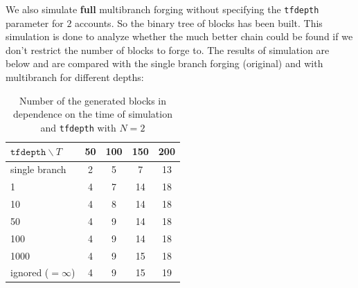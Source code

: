 \documentclass[12pt]{article}
\begin{document}
We also simulate {\bf full} multibranch forging without specifying the \texttt{tfdepth} parameter for $2$ accounts. So the binary tree of blocks has been
built. This simulation is done to analyze whether the much better chain could be found if we don't restrict the number of blocks to forge to. The results
of simulation are below and are compared with the single branch forging (original) and with multibranch for different depths:

\begin{table}[H]
\caption{Number of the generated blocks in dependence on the time of simulation and \texttt{tfdepth} with $N=2$}
\begin{center}
\begin{tabular}{|l|c|c|c|c|}
\hline
$\texttt{tfdepth}\backslash T$ & 50 & 100 & 150 & 200\\
\hline
single branch & 2 & 5 & 7 & 13\\
1 & 4 & 7 & 14 & 18\\
10 & 4 & 8 & 14 & 18 \\
50 & 4 & 9 & 14 & 18 \\
100 & 4 & 9 & 14 & 18 \\
1000 & 4 & 9 & 15 & 18 \\
ignored ($=\infty$) & 4 & 9 & 15 & 19\\
\hline
\end{tabular}
\end{center}
\end{table}
 
\end{document}
